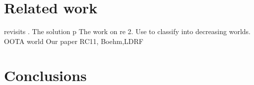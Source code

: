 \section{Related work}

\citet{BoehmOOTA} revisits \oota.  The solution p
The work on re
2. Use\cite{BoehmOOTA} to 
classify into decreasing worlds.
           OOTA world
              Our paper
                 RC11, Boehm,LDRF




\section{Conclusions}
\label{sec:outro}

